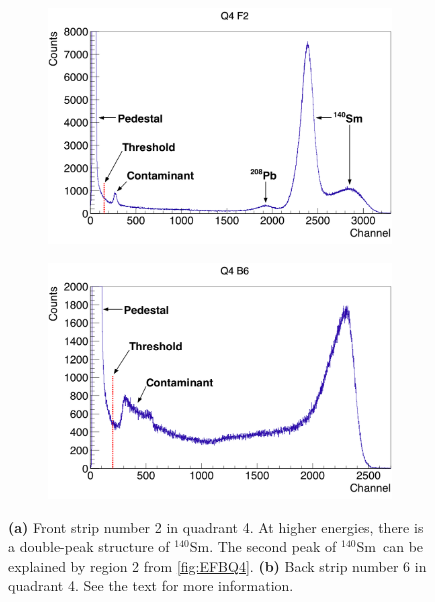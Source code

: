 \documentclass[twoside,english]{uiofysmaster/uiofysmaster}
\newcommand{\Sm}{$^{140}$Sm} %
\let\orgautoref\autoref
\renewcommand{\autoref}
        {%
		 \def\sectionautorefname{Section}%
		 \def\subsectionautorefname{Section}%
		 \def\subsubsectionautorefname{Section}%
		 \def\chapterautorefname{Chapter}%
          \orgautoref}
\begin{document}
\begin{figure}[htb]
	\centering
	\begin{subfigure}[t]{0.49\textwidth}
		\centering
		\includegraphics[width=\textwidth]{../Plots/plotting/Threshold_Q4_f2.png}
		\caption{}
		\label{fig:th_f}
	\end{subfigure}
	\hfill 
	\begin{subfigure}[t]{0.49\textwidth}
		\centering
    		\includegraphics[width=\textwidth]{../Plots/plotting/Threshold_Q4_b6.png}
		\caption{}
		\label{fig:th_b}
	\end{subfigure}
	\caption{\textbf{(a)} Front strip number 2 in quadrant 4. 
	At higher energies, there is a double-peak structure of \Sm. 
	The second peak of \Sm\ can be explained by region 2 from \autoref{fig:EFBQ4}.
	\textbf{(b)} Back strip number 6 in quadrant 4.
	See the text for more information.}
	\label{fig:threshold}
\end{figure}
\end{document}
